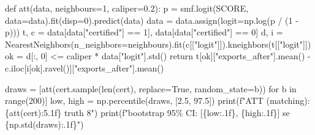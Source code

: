 \documentclass[
  letterpaper,
  10pt,
  twoside,
  openright,
  numbers=noenddot,
  chapterprefix=true]{scrbook}
\newenvironment{Shaded}{}{}
\newcommand{\BuiltInTok}[1]{\textcolor[rgb]{0.84,0.23,0.29}{#1}}
\newcommand{\ControlFlowTok}[1]{\textcolor[rgb]{0.84,0.23,0.29}{#1}}
\newcommand{\DecValTok}[1]{\textcolor[rgb]{0.00,0.36,0.77}{#1}}
\newcommand{\FloatTok}[1]{\textcolor[rgb]{0.00,0.36,0.77}{#1}}
\newcommand{\KeywordTok}[1]{\textcolor[rgb]{0.84,0.23,0.29}{#1}}
\newcommand{\NormalTok}[1]{\textcolor[rgb]{0.14,0.16,0.18}{#1}}
\newcommand{\OperatorTok}[1]{\textcolor[rgb]{0.14,0.16,0.18}{#1}}
\newcommand{\SpecialCharTok}[1]{\textcolor[rgb]{0.00,0.36,0.77}{#1}}
\newcommand{\SpecialStringTok}[1]{\textcolor[rgb]{0.01,0.18,0.38}{#1}}
\newcommand{\StringTok}[1]{\textcolor[rgb]{0.01,0.18,0.38}{#1}}
\newcommand{\VariableTok}[1]{\textcolor[rgb]{0.89,0.38,0.04}{#1}}
\begin{document}
\label{check-cert-att}
\begin{Shaded}
\begin{Highlighting}[]
\KeywordTok{def}\NormalTok{ att(data, neighbours}\OperatorTok{=}\DecValTok{1}\NormalTok{, caliper}\OperatorTok{=}\FloatTok{0.2}\NormalTok{):}
\NormalTok{    p }\OperatorTok{=}\NormalTok{ smf.logit(SCORE, data}\OperatorTok{=}\NormalTok{data).fit(disp}\OperatorTok{=}\DecValTok{0}\NormalTok{).predict(data)}
\NormalTok{    data }\OperatorTok{=}\NormalTok{ data.assign(logit}\OperatorTok{=}\NormalTok{np.log(p }\OperatorTok{/}\NormalTok{ (}\DecValTok{1} \OperatorTok{{-}}\NormalTok{ p)))}
\NormalTok{    t, c }\OperatorTok{=}\NormalTok{ data[data[}\StringTok{"certified"}\NormalTok{] }\OperatorTok{==} \DecValTok{1}\NormalTok{], data[data[}\StringTok{"certified"}\NormalTok{] }\OperatorTok{==} \DecValTok{0}\NormalTok{]}
\NormalTok{    d, i }\OperatorTok{=}\NormalTok{ NearestNeighbors(n\_neighbors}\OperatorTok{=}\NormalTok{neighbours).fit(c[[}\StringTok{"logit"}\NormalTok{]]).kneighbors(t[[}\StringTok{"logit"}\NormalTok{]])}
\NormalTok{    ok }\OperatorTok{=}\NormalTok{ d[:, }\DecValTok{0}\NormalTok{] }\OperatorTok{\textless{}=}\NormalTok{ caliper }\OperatorTok{*}\NormalTok{ data[}\StringTok{"logit"}\NormalTok{].std()}
    \ControlFlowTok{return}\NormalTok{ t[ok][}\StringTok{"exports\_after"}\NormalTok{].mean() }\OperatorTok{{-}}\NormalTok{ c.iloc[i[ok].ravel()][}\StringTok{"exports\_after"}\NormalTok{].mean()}


\NormalTok{draws }\OperatorTok{=}\NormalTok{ [att(cert.sample(}\BuiltInTok{len}\NormalTok{(cert), replace}\OperatorTok{=}\VariableTok{True}\NormalTok{, random\_state}\OperatorTok{=}\NormalTok{b)) }\ControlFlowTok{for}\NormalTok{ b }\KeywordTok{in} \BuiltInTok{range}\NormalTok{(}\DecValTok{200}\NormalTok{)]}
\NormalTok{low, high }\OperatorTok{=}\NormalTok{ np.percentile(draws, [}\FloatTok{2.5}\NormalTok{, }\FloatTok{97.5}\NormalTok{])}
\BuiltInTok{print}\NormalTok{(}\SpecialStringTok{f"ATT (matching):    }\SpecialCharTok{\{}\NormalTok{att(cert)}\SpecialCharTok{:5.1f\}}\SpecialStringTok{   truth 8"}\NormalTok{)}
\BuiltInTok{print}\NormalTok{(}\SpecialStringTok{f"bootstrap 95\% CI:  [}\SpecialCharTok{\{}\NormalTok{low}\SpecialCharTok{:.1f\}}\SpecialStringTok{, }\SpecialCharTok{\{}\NormalTok{high}\SpecialCharTok{:.1f\}}\SpecialStringTok{]   se }\SpecialCharTok{\{}\NormalTok{np}\SpecialCharTok{.}\NormalTok{std(draws)}\SpecialCharTok{:.1f\}}\SpecialStringTok{"}\NormalTok{)}


\end{Highlighting}
\end{Shaded}
\end{document}
